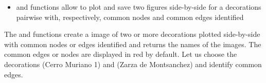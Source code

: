 \documentclass[article]{jss}\usepackage{knitr}
\begin{document}

\begin{itemize}
\setlength\itemsep{.1em}
  \item {} and  functions allow to plot and save two figures side-by-side for a decorations pairwise with, respectively, common nodes and common edges identified
\end{itemize}

The and  functions create a  image of two or more decorations plotted side-by-side with common nodes or edges identified and returns the names of the images. The common edges or nodes are displayed in red by default.
Let us choose the decorations  (Cerro Muriano 1) and  (Zarza de Montsanchez) and identify common edges.
\end{document}
